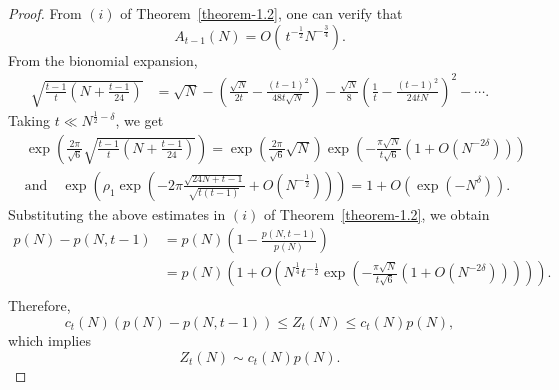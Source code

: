\documentclass[10pt,a4paper]{amsart}
\begin{document}
	\begin{proof}
		From \hyperlink{thm1.2i}{$(i)$} of Theorem~\ref{theorem-1.2}, one can verify that  
		\begin{equation*}
			A_{t-1}(N)= O\left(\, t^{-\frac{1}{2}} N^{-\tfrac{3}{4}}\right).
		\end{equation*}
		From the bionomial expansion,
		\begin{align*}
			\sqrt{\frac{t-1}{t}\left(N+\frac{t-1}{24}\right)} &= \sqrt{N}-\left(\frac{\sqrt{N}}{2t}-\frac{(t-1)^{2}}{48t\sqrt{N}}\right)-\frac{\sqrt{N}}{8}\left(\frac{1}{t}-\frac{(t-1)^{2}}{24tN}\right)^{2}-\cdots .
		\end{align*}
		Taking $t \ll N^{\frac{1}{2}-\delta}$, we get
		\begin{align*}
			&\exp\left(\frac{2\pi}{\sqrt{6}}\sqrt{\frac{t-1}{t}\left(N+\frac{t-1}{24}\right)}\right)= \exp\left(\frac{2\pi}{\sqrt{6}}\sqrt{N}\right)\exp\left(-\frac{\pi\sqrt{N}}{t\sqrt{6}}\left(1+O\left(N^{-2\delta}\right)\right)\right)\\
			&\text{and}\quad \exp\left(\rho_1\exp\left(-2\pi\frac{\sqrt{24N+t-1}}{\sqrt{t(t-1)}}+O\left(N^{-\frac{1}{2}}\right)\right)\right)=1+O\left(\exp\left(-N^{\delta}\right)\right).
		\end{align*}
		Substituting the above estimates in \hyperlink{thm1.2i}{$(i)$} of Theorem~\ref{theorem-1.2}, we obtain 
		\begin{align*}
			p(N)-p(N,t-1)&=p(N)\left(1-\frac{p(N,t-1)}{p(N)}\right)\\
			&=p(N)\left(1+O\left(N^{\frac{1}{4}}t^{-\frac{1}{2}}\exp\left(-\frac{\pi\sqrt{N}}{t\sqrt{6}}\left(1+O\left(N^{-2\delta}\right)\right)\right)\right)\right).\\
		\end{align*}
		Therefore,
		\begin{equation*}
			c_{t}(N)\left(p(N)-p(N,t-1)\right)\le Z_{t}(N)\le c_{t}(N)p(N),
		\end{equation*}
		which implies 
		\begin{equation*}
			Z_{t}(N)\sim c_{t}(N)p(N).   
		\end{equation*}    
	\end{proof}
\end{document}
